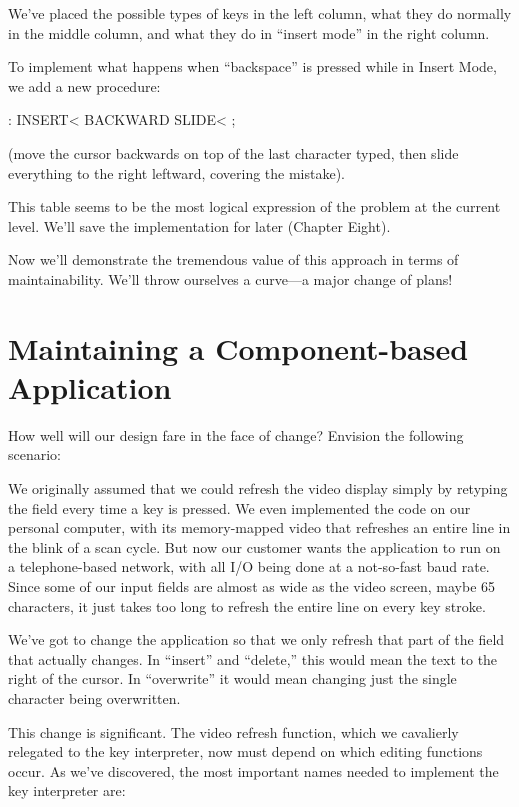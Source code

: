 We've placed the possible types of keys in the left column, what they do
normally in the middle column, and what they do in ``insert mode'' in the
right column.

To implement what happens when ``backspace'' is pressed while in
Insert Mode, we add a new procedure:

\begin{Code}
: INSERT< BACKWARD SLIDE< ;
\end{Code}

(move the cursor backwards on top of the last character typed, then slide
everything to the right leftward, covering the mistake).

This table seems to be the most logical expression of the problem at
the current level. We'll save the implementation for later (Chapter Eight).

Now we'll demonstrate the tremendous value of this approach in
terms of maintainability. We'll throw ourselves a curve---a major change
of plans!

\section{Maintaining a Component-based Application}

How well will our design fare in the face of change? Envision the following
scenario:

We originally assumed that we could refresh the video display simply
by retyping the field every time a key is pressed. We even implemented
the code on our personal computer, with its memory-mapped video that
refreshes an entire line in the blink of a scan cycle. But now our
customer wants the application to run on a telephone-based network,
with all I/O being done at a not-so-fast baud rate. Since some of our
input fields are almost as wide as the video screen, maybe 65
characters, it just takes too long to refresh the entire line on every
key stroke.

We've got to change the application so that we only refresh that
part of the field that actually changes. In ``insert'' and ``delete,'' this
would mean the text to the right of the cursor. In ``overwrite'' it would
mean changing just the single character being overwritten.

This change is significant. The video refresh function, which we
cavalierly relegated to the key interpreter, now must depend on which
editing functions occur. As we've discovered, the most important names
needed to implement the key interpreter are:

